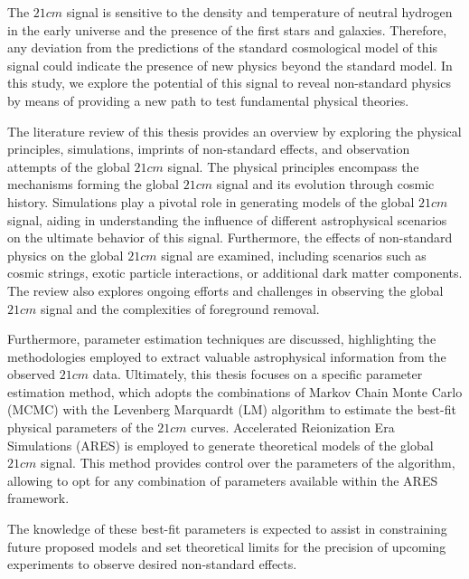\documentclass[12pt, TexShade, letterpaper]{report}
\begin{document}
The $21cm$ signal is sensitive to the density and temperature of neutral hydrogen in the early universe and the presence of the first stars and galaxies. Therefore, any deviation from the predictions of the standard cosmological model of this signal could indicate the presence of new physics beyond the standard model. In this study, we explore the potential of this signal to reveal non-standard physics by means of providing a new path to test fundamental physical theories. \par

The literature review of this thesis provides an overview by exploring the physical principles, simulations, imprints of non-standard effects, and observation attempts of the global $21cm$ signal. The physical principles encompass the mechanisms forming the global $21cm$ signal and its evolution through cosmic history. Simulations play a pivotal role in generating models of the global $21cm$ signal, aiding in understanding the influence of different astrophysical scenarios on the ultimate behavior of this signal. Furthermore, the effects of non-standard physics on the global $21cm$ signal are examined, including scenarios such as cosmic strings, exotic particle interactions, or additional dark matter components. The review also explores ongoing efforts and challenges in observing the global $21cm$ signal and the complexities of foreground removal.\par

Furthermore, parameter estimation techniques are discussed, highlighting the methodologies employed to extract valuable astrophysical information from the observed $21cm$ data. Ultimately, this thesis focuses on a specific parameter estimation method, which adopts the combinations of Markov Chain Monte Carlo (MCMC) with the Levenberg Marquardt (LM) algorithm to estimate the best-fit physical parameters of the $21cm$ curves. Accelerated Reionization Era Simulations (ARES) is employed to generate theoretical models of the global $21cm$ signal. This method provides control over the parameters of the algorithm, allowing to opt for any combination of parameters available within the ARES framework.\par

The knowledge of these best-fit parameters is expected to assist in constraining future proposed models and set theoretical limits for the precision of upcoming experiments to observe desired non-standard effects.\par
\end{document}
